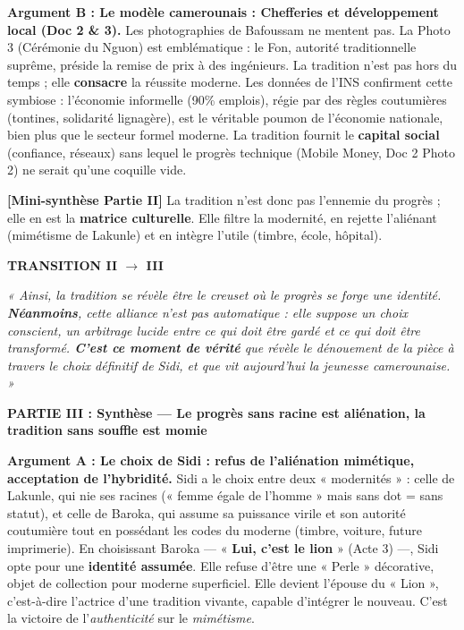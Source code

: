 \documentclass[11pt]{article}
\begin{document}
\begin{exoresolu}
\noindent \textbf{Argument B : Le modèle camerounais : Chefferies et développement local (Doc 2 \& 3).}
Les photographies de Bafoussam ne mentent pas. La Photo 3 (Cérémonie du Nguon) est emblématique : le Fon, autorité traditionnelle suprême, préside la remise de prix à des ingénieurs. La tradition n'est pas hors du temps ; elle \textbf{consacre} la réussite moderne. Les données de l'INS confirment cette symbiose : l'économie informelle (90\% emplois), régie par des règles coutumières (tontines, solidarité lignagère), est le véritable poumon de l'économie nationale, bien plus que le secteur formel moderne. La tradition fournit le \textbf{capital social} (confiance, réseaux) sans lequel le progrès technique (Mobile Money, Doc 2 Photo 2) ne serait qu'une coquille vide.

\noindent \textbf{[Mini-synthèse Partie II]} La tradition n'est donc pas l'ennemie du progrès ; elle en est la \textbf{matrice culturelle}. Elle filtre la modernité, en rejette l'aliénant (mimétisme de Lakunle) et en intègre l'utile (timbre, école, hôpital).

\medskip
\noindent \textbf{TRANSITION II $\rightarrow$ III}
\begin{center}
    \textit{« Ainsi, la tradition se révèle être le creuset où le progrès se forge une identité. \textbf{Néanmoins}, cette alliance n'est pas automatique : elle suppose un choix conscient, un arbitrage lucide entre ce qui doit être gardé et ce qui doit être transformé. \textbf{C'est ce moment de vérité} que révèle le dénouement de la pièce à travers le choix définitif de Sidi, et que vit aujourd'hui la jeunesse camerounaise. »}
\end{center}

\medskip
\noindent \textbf{PARTIE III : Synthèse — Le progrès sans racine est aliénation, la tradition sans souffle est momie}

\noindent \textbf{Argument A : Le choix de Sidi : refus de l'aliénation mimétique, acceptation de l'hybridité.}
Sidi a le choix entre deux « modernités » : celle de Lakunle, qui nie ses racines (« femme égale de l'homme » mais sans dot = sans statut), et celle de Baroka, qui assume sa puissance virile et son autorité coutumière tout en possédant les codes du moderne (timbre, voiture, future imprimerie). En choisissant Baroka — « \textbf{Lui, c'est le lion} » (Acte 3) —, Sidi opte pour une \textbf{identité assumée}. Elle refuse d'être une « Perle » décorative, objet de collection pour moderne superficiel. Elle devient l'épouse du « Lion », c'est-à-dire l'actrice d'une tradition vivante, capable d'intégrer le nouveau. C'est la victoire de l'\emph{authenticité} sur le \emph{mimétisme}.


\end{exoresolu}
\end{document}
